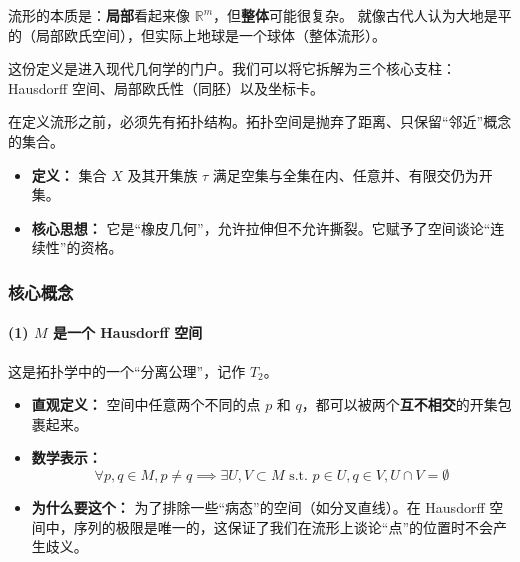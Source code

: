 \begin{myremark}[拓扑流形]


流形的本质是：\textbf{局部}看起来像 $\mathbb{R}^m$，但\textbf{整体}可能很复杂。
就像古代人认为大地是平的（局部欧氏空间），但实际上地球是一个球体（整体流形）。

这份定义是进入现代几何学的门户。我们可以将它拆解为三个核心支柱：Hausdorff 空间、局部欧氏性（同胚）以及坐标卡。

在定义流形之前，必须先有拓扑结构。拓扑空间是抛弃了距离、只保留“邻近”概念的集合。
\begin{itemize}
    \item \textbf{定义：} 集合 $X$ 及其开集族 $\tau$ 满足空集与全集在内、任意并、有限交仍为开集。
    \item \textbf{核心思想：} 它是“橡皮几何”，允许拉伸但不允许撕裂。它赋予了空间谈论“连续性”的资格。
\end{itemize}

\subsubsection*{核心概念}
\paragraph*{(1)  $M$ 是一个 Hausdorff 空间}
这是拓扑学中的一个“分离公理”，记作 $T_2$。
\begin{itemize}
\item \textbf{直观定义：} 空间中任意两个不同的点 $p$ 和 $q$，都可以被两个\textbf{互不相交}的开集包裹起来。
\item \textbf{数学表示：}
$$ \forall p, q \in M, p \neq q \implies \exists U, V \subset M \text{ s.t. } p \in U, q \in V, U \cap V = \emptyset $$

\item \textbf{为什么要这个：} 为了排除一些“病态”的空间（如分叉直线）。在 Hausdorff 空间中，序列的极限是唯一的，这保证了我们在流形上谈论“点”的位置时不会产生歧义。
\end{itemize}


\end{myremark}
